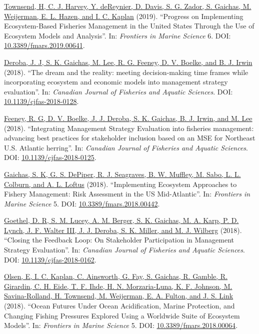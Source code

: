 \documentclass[11pt, a4paper]{awesome-cv}
\begin{document}
\protect\hyperlink{cite-townsend_progress_2019}{Townsend, H, C. J. Harvey, Y.
deReynier, D. Davis, S. G. Zador, S. Gaichas, M. Weijerman, E. L.
Hazen, and I. C. Kaplan} (2019).
``Progress on Implementing Ecosystem-Based Fisheries Management in the
United States Through the Use of Ecosystem Models and Analysis''. In:
\emph{Frontiers in Marine Science} 6. DOI:
\href{https://doi.org/10.3389\%2Ffmars.2019.00641}{10.3389/fmars.2019.00641}.

\protect\hyperlink{cite-deroba_dream_2018}{Deroba, J. J, S. K. Gaichas, M. Lee,
R. G. Feeney, D. V. Boelke, and B. J. Irwin}
(2018). ``The dream and the reality: meeting decision-making time frames
while incorporating ecosystem and economic models into management
strategy evaluation''. In: \emph{Canadian Journal of Fisheries and Aquatic
Sciences}. DOI:
\href{https://doi.org/10.1139\%2Fcjfas-2018-0128}{10.1139/cjfas-2018-0128}.

\protect\hyperlink{cite-feeney_integrating_2018}{Feeney, R. G, D. V. Boelke, J.
J. Deroba, S. K. Gaichas, B. J. Irwin, and M.
Lee} (2018). ``Integrating Management
Strategy Evaluation into fisheries management: advancing best practices
for stakeholder inclusion based on an MSE for Northeast U.S. Atlantic
herring''. In: \emph{Canadian Journal of Fisheries and Aquatic Sciences}.
DOI:
\href{https://doi.org/10.1139\%2Fcjfas-2018-0125}{10.1139/cjfas-2018-0125}.

\protect\hyperlink{cite-gaichas_implementing_2018}{Gaichas, S. K, G. S.
DePiper, R. J. Seagraves, B. W. Muffley, M. Sabo, L. L. Colburn, and A.
L. Loftus} (2018). ``Implementing
Ecosystem Approaches to Fishery Management: Risk Assessment in the US
Mid-Atlantic''. In: \emph{Frontiers in Marine Science} 5. DOI:
\href{https://doi.org/10.3389\%2Ffmars.2018.00442}{10.3389/fmars.2018.00442}.

\protect\hyperlink{cite-goethel_closing_2018}{Goethel, D. R, S. M. Lucey, A. M.
Berger, S. K. Gaichas, M. A. Karp, P. D. Lynch, J. F. Walter III, J. J.
Deroba, S. K. Miller, and M. J. Wilberg}
(2018). ``Closing the Feedback Loop: On Stakeholder Participation in
Management Strategy Evaluation''. In: \emph{Canadian Journal of Fisheries and
Aquatic Sciences}. DOI:
\href{https://doi.org/10.1139\%2Fcjfas-2018-0162}{10.1139/cjfas-2018-0162}.

\protect\hyperlink{cite-olsen_ocean_2018}{Olsen, E, I. C. Kaplan, C. Ainsworth,
G. Fay, S. Gaichas, R. Gamble, R. Girardin, C. H. Eide, T. F. Ihde, H.
N. Morzaria-Luna, K. F. Johnson, M. Savina-Rolland, H. Townsend, M.
Weijerman, E. A. Fulton, and J. S. Link}
(2018). ``Ocean Futures Under Ocean Acidification, Marine Protection,
and Changing Fishing Pressures Explored Using a Worldwide Suite of
Ecosystem Models''. In: \emph{Frontiers in Marine Science} 5. DOI:
\href{https://doi.org/10.3389\%2Ffmars.2018.00064}{10.3389/fmars.2018.00064}.
\end{document}
